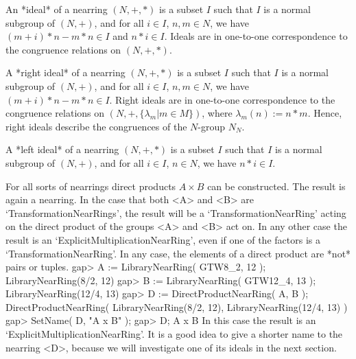 %
%

An *ideal* of a nearring $(N,+,*)$ is a subset $I$ such that
$I$ is a normal subgroup of $(N,+)$, and
for all $i \in I$, $n,m \in N$, we have
$(m+i)*n - m*n \in I$ and $n*i \in I$. Ideals are in
one-to-one correspondence to the congruence relations
on $(N,+,*)$.

A *right ideal* of a nearring $(N,+,*)$ is a subset $I$ such that
$I$ is a normal subgroup of $(N,+)$, and
for all $i \in I$, $n,m \in N$, we have
$(m+i)*n - m*n \in I$. Right ideals are in
one-to-one correspondence to the congruence relations
on $(N,+, \{ \lambda_m | m \in M \} )$, where
$\lambda_m (n) := n*m$. Hence, right ideals
describe the congruences of the $N$-group
$N_N$. 

A *left ideal* of a nearring $(N,+,*)$ is a subset $I$ such that
$I$ is a normal subgroup of $(N,+)$, and
for all $i \in I$, $n \in N$, we have
$n*i \in I$. 



For all sorts of nearrings direct products $A \times B$ can be constructed. The
result is again a nearring. In the case that both <A> and <B>
are `TransformationNearRings', the result will be a `TransformationNearRing'
acting on the direct product of the groups <A> and <B> act on. In any other
case the result is an `ExplicitMultiplicationNearRing', even if one of the
factors is a `TransformationNearRing'. In any case, the elements of a direct
product are *not* pairs or tuples.
\beginexample
    gap> A := LibraryNearRing( GTW8_2, 12 );
    LibraryNearRing(8/2, 12)
    gap> B := LibraryNearRing( GTW12_4, 13 );
    LibraryNearRing(12/4, 13)
    gap> D := DirectProductNearRing( A, B );
    DirectProductNearRing( LibraryNearRing(8/2, 12),
      LibraryNearRing(12/4, 13) )
    gap> SetName( D, "A x B" );
    gap> D;
    A x B
\endexample
        In this case the result is an `ExplicitMultiplicationNearRing'.
        It is a good idea to give a shorter name to the nearring <D>, because
        we will investigate one of its ideals in the next section.
 
